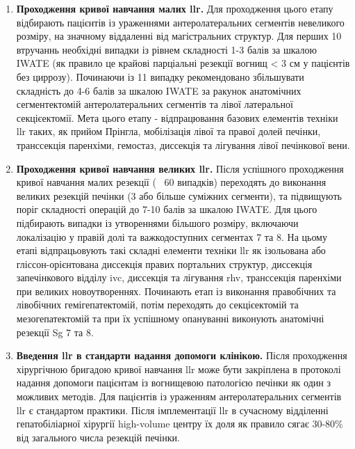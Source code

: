 \begin{refsection}
\begin{enumerate}
   \item \textbf{Проходження кривої навчання малих \acrshort{llr}.} Для проходження цього етапу відбирають пацієнтів із ураженнями антеролатеральних сегментів невеликого розміру, на значному віддаленні від магістральних структур. Для перших 10 втручаннь необхідні випадки із рівнем складності 1-3 балів за шкалою IWATE (як правило це крайові парціальні резекції вогнищ < 3 см у пацієнтів без циррозу). Починаючи із 11 випадку рекомендовано збільшувати складність до 4-6 балів за шкалою IWATE за ракунок анатомічних сегментектомій антеролатеральних сегментів та лівої латеральної секцієектомії. Мета цього етапу - відпрацювання базових елементів техніки \acrshort{llr} таких, як прийом Прінгла, мобілізація лівої та правої долей печінки, транссекція паренхіми, гемостаз, диссекція та лігування лівої печінкової вени.
    
   \item \textbf{Проходження кривої навчання великих \acrshort{llr}.} Після успішного проходження кривої навчання малих резекції (~ 60 випадків) переходять до виконання великих резекцій печінки (3 або більше суміжних сегменти), та підвищують поріг складності операцій до 7-10 балів за шкалою IWATE. Для цього підбирають випадки із утвореннями більшого розміру, включаючи локалізацію у правій долі та важкодоступних сегментах 7 та 8. На цьому етапі відпрацьовують такі складні елементи техніки \acrshort{llr} як  ізольована або гліссон-орієнтована диссекція правих портальних структур, диссекція запечінкового відділу \acrshort{ivc}, диссекція та лігування \acrshort{rhv}, транссекція паренхіми при великих новоутвореннях. Починають етап із виконання правобічних та лівобічних гемігепатектомій, потім переходять до секцієектомій та мезогепатектомій та при їх успішному опануванні виконують анатомічні резекції Sg 7 та 8. 
    
   \item \textbf{Введення \acrshort{llr} в стандарти надання допомоги клінікою.} Після проходження хірургічною бригадою кривої навчання \acrshort{llr} може бути закріплена в протоколі надання допомоги пацієнтам із вогнищевою патологією печінки як один з можливих методів. Для пацієнтів із ураженням антеролатеральних сегментів \acrshort{llr} є стандартом практики. Після імплементації \acrshort{llr} в сучасному відділенні гепатобіліарної хірургії high-volume центру їх доля як правило сягає 30-80\% від загального числа резекцій печінки. 

\end{enumerate}


\printbibliography[heading=subbibliography] 

\end{refsection}